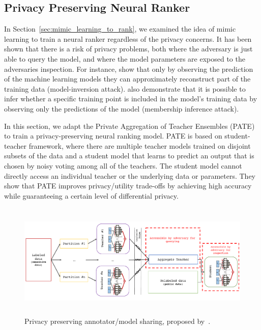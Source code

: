\subsection{Privacy Preserving Neural Ranker}
In Section~\ref{sec:mimic_learning_to_rank}, we examined the idea of mimic learning to train a neural ranker regardless of the privacy concerns.
It has been shown that there is a risk of privacy problems, both where the adversary is just able to query the model, and where the model parameters are exposed to the adversaries inspection.
For instance, \citet{Fredrikson:2015} show that only by observing the prediction of the machine learning models they can approximately reconstruct part of the training data (model-inversion attack). \citet{Shokri:2016} also demonstrate that it is possible to infer whether a specific training point is included in the model's training data by observing only the predictions of the model (membership inference attack).

In this section, we adapt the Private Aggregation of Teacher Ensembles (PATE)~\citep{Papernot:2017} to train a privacy-preserving neural ranking model.  PATE is based on student-teacher framework\cite{Hinton:2015}, where there are multiple teacher models trained on disjoint subsets of the data and a student model that learns to predict an output that is chosen by noisy voting among all of the teachers. The student model cannot directly access an individual teacher or the underlying data or parameters. They show that PATE improves privacy/utility trade-offs by achieving high accuracy while guaranteeing a certain level of differential privacy.

\begin{figure}[t]
    \centering
    \includegraphics[height=5.5cm]{03-part-02/chapter-04/figs_and_tables/fig_privacy_preserving_ranker_model.pdf}%
    \caption{\label{fig:pp_model} Privacy preserving annotator/model sharing, proposed by~\citet{Papernot:2017}.}
\end{figure}

